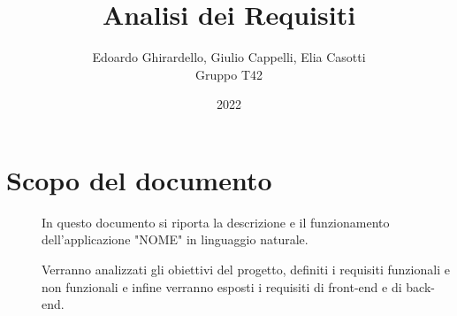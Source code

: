 \documentclass{article}
\title{\textbf{\Huge Analisi dei Requisiti}}
\author{Edoardo Ghirardello, Giulio Cappelli, Elia Casotti \\ Gruppo T42}
\date{2022}
\begin{document}
\maketitle

\clearpage
\tableofcontents
\clearpage

\section{Scopo del documento}
\begin{description}
    \item[] In questo documento si riporta la descrizione e il funzionamento dell'applicazione "NOME" in linguaggio naturale.
    \item[] Verranno analizzati gli obiettivi del progetto, definiti i requisiti funzionali e non funzionali e infine verranno esposti i requisiti di front-end e di back-end.
\end{description}
\clearpage
\end{document}
